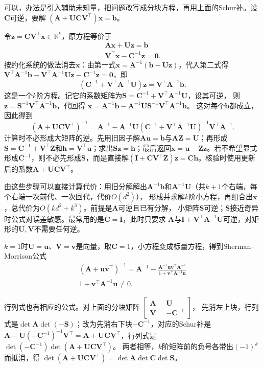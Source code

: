可以，办法是引入辅助未知量，把问题改写成分块方程，再用上面的Schur补。设$\bm C$可逆，要解
$(\bm A+\bm U\bm C\bm V^\top)\bm x=\bm b$。

令$\bm z=\bm C\bm V^\top\bm x\in\mathbb R^k$，原方程等价于
\[
 \begin{gathered}
\bm A\bm x+\bm U\bm z=\bm b\\
\bm V^\top\bm x-\bm C^{-1}\bm z=\bm0 .
 \end{gathered}
\]
按约化系统的做法消去$\bm x$：由第一式$\bm x=\bm A^{-1}(\bm b-\bm U\bm z)$，代入第二式得
$\bm V^\top\bm A^{-1}\bm b-\bm V^\top\bm A^{-1}\bm U\bm z-\bm C^{-1}\bm z=\bm0$，即
\[
 (\bm C^{-1}+\bm V^\top\bm A^{-1}\bm U)\bm z=\bm V^\top\bm A^{-1}\bm b .
\]
这是一个$k$阶方程。记它的系数矩阵为$\bm S=\bm C^{-1}+\bm V^\top\bm A^{-1}\bm U$，设其可逆，
则$\bm z=\bm S^{-1}\bm V^\top\bm A^{-1}\bm b$，代回得
$\bm x=\bm A^{-1}\bm b-\bm A^{-1}\bm U\bm S^{-1}\bm V^\top\bm A^{-1}\bm b$。
这对每个$\bm b$都成立，因此得到
\begin{equation}
 (\bm A+\bm U\bm C\bm V^\top)^{-1}
 =\bm A^{-1}-\bm A^{-1}\bm U
 (\bm C^{-1}+\bm V^\top\bm A^{-1}\bm U)^{-1}
 \bm V^\top\bm A^{-1}.
 \label{eq:matrix-analysis-woodbury}
\end{equation}
计算时不必形成大矩阵的逆。先用旧因子解$\bm A\bm u=\bm b$与$\bm A\bm Z=\bm U$；再形成$\bm S=\bm C^{-1}+\bm V^\top\bm Z$和$\bm h=\bm V^\top\bm u$；求出$\bm S\bm z=\bm h$；最后返回$\bm x=\bm u-\bm Z\bm z$。若不希望显式形成$\bm C^{-1}$，则不必先形成$\bm S$，而是直接解$(\bm I+\bm C\bm V^\top\bm Z)\bm z=\bm C\bm h$。核验时使用更新后的系数$\bm A+\bm U\bm C\bm V^\top$。

由这些步骤可以直接计算代价：用旧分解解出$\bm A^{-1}\bm b$和$\bm A^{-1}\bm U$（共$k+1$个右端，每个右端一次前代、一次回代，代价$O(d^2)$），
形成并求解$k$阶小方程，再组合出$\bm x$，总代价为$O(kd^2+k^3)$。前提是$\bm A$可逆且已有分解，
小矩阵$\bm S$可逆；$\bm S$接近奇异时公式对误差敏感。最常用的是$\bm C=\bm I$，此时只要求
$\bm A$与$\bm I+\bm V^\top\bm A^{-1}\bm U$可逆，对矩形的$\bm U,\bm V$不需要任何逆。

$k=1$时$\bm U=\bm u$、$\bm V=\bm v$是向量，取$\bm C=1$，小方程变成标量方程，得到Sherman--Morrison公式
\[
\begin{gathered}
(\bm A+\bm u\bm v^\top)^{-1}
 =\bm A^{-1}-\frac{\bm A^{-1}\bm u\bm v^\top\bm A^{-1}}
 {1+\bm v^\top\bm A^{-1}\bm u}\\
1+\bm v^\top\bm A^{-1}\bm u\neq0 .
\end{gathered}
\]

行列式也有相应的公式。对上面的分块矩阵
$\left[\begin{smallmatrix}\bm A&\bm U\\\bm V^\top&-\bm C^{-1}\end{smallmatrix}\right]$，
先消左上块，行列式是$\det\bm A\det(-\bm S)$；改为先消右下块$-\bm C^{-1}$，对应的Schur补是
$\bm A-\bm U(-\bm C^{-1})^{-1}\bm V^\top=\bm A+\bm U\bm C\bm V^\top$，行列式是$\det(-\bm C^{-1})\det(\bm A+\bm U\bm C\bm V^\top)$。
两者相等，$k$阶矩阵前的负号各带出$(-1)^k$而抵消，得
$\det(\bm A+\bm U\bm C\bm V^\top)=\det\bm A\det\bm C\det\bm S$。


